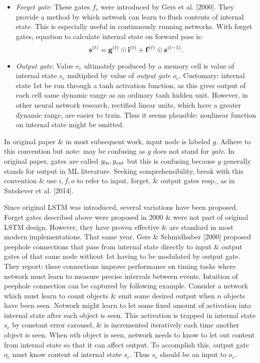 \documentclass{article}
\begin{document}
\begin{enumerate}
\begin{itemize}
\begin{itemize}
\begin{itemize}
				\item {\it Forget gate}: These gates $f_c$ were introduced by Gers et al. [2000]. They provide a method by which network can learn to flush contents of internal state. This is especially useful in continuously running networks. With forget gates, equation to calculate internal state on forward pass is:
				\begin{equation}
					{\bf s}^{(t)} = {\bf g}^{(t)}\odot{\bf i}^{(t)} + {\bf f}^{(t)}\odot{\bf s}^{(t - 1)}.
				\end{equation}
				\item {\it Output gate}: Value $v_c$ ultimately produced by a memory cell is value of internal state $s_c$ multiplied by value of {\it output gate} $o_c$. Customary: internal state 1st be run through a tanh activation function, as this gives output of each cell same dynamic range as an ordinary tanh hidden unit. However, in other neural network research, rectified linear units, which have a greater dynamic range, are easier to train. Thus it seems plausible: nonlinear function on internal state might be omitted.
			\end{itemize}
			In original paper \& in most subsequent work, input node is labeled $g$. Adhere to this convention but note: may be confusing as $g$ does not stand for {\it gate}. In original paper, gates are called $y_{\rm in},y_{\rm out}$ but this is confusing because $y$ generally stands for output in ML literature. Seeking comprehensibility, break with this convention \& use $i,f,o$ to refer to input, forget, \& output gates resp., as in Sutskever et al. [2014].
			
			Since original LSTM was introduced, several variations have been proposed. Forget gates described above were proposed in 2000 \& were not part of original LSTM design. However, they have proven effective \& are standard in most modern implementations. That same year, Gers \& Schmidhuber [2000] proposed peephole connections that pass from internal state directly to input \& output gates of that same node without 1st having to be modulated by output gate. They report: these connections improve performance on timing tasks where network must learn to measure precise intervals between events. Intuition of peephole connection can be captured by following example. Consider a network which must learn to count objects \& emit some desired output when $n$ objects have been seen. Network might learn to let some fixed amount of activation into internal state after each object is seen. This activation is trapped in internal state $s_c$ by constant error carousel, \& is incremented iteratively each time another object is seen. When $n$th object is seen, network needs to know to let out content from internal state so that it can affect output. To accomplish this, output gate $o_c$ must know content of internal state $s_c$. Thus $s_c$ should be an input to $o_c$.
			

\end{itemize}
\end{itemize}
\end{enumerate}
\end{document}
